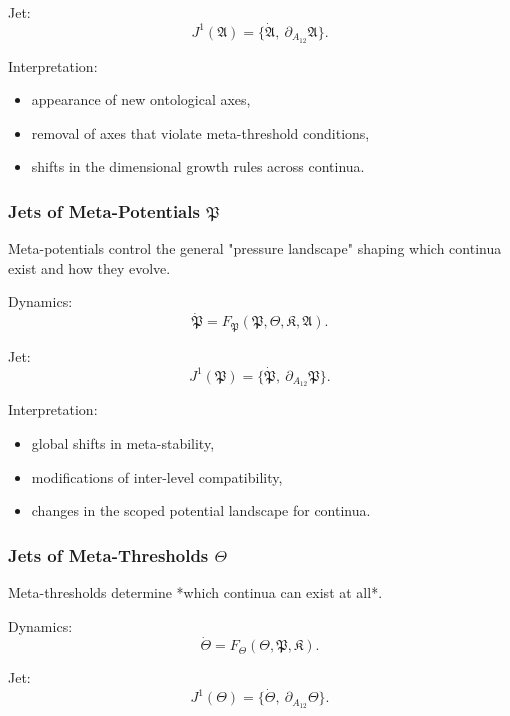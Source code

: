 Jet:
\[
J^1(\mathfrak{A})
= \{\dot{\mathfrak{A}},\ \partial_{A_{12}}\mathfrak{A}\}.
\]

Interpretation:
\begin{itemize}
    \item appearance of new ontological axes,
    \item removal of axes that violate meta-threshold conditions,
    \item shifts in the dimensional growth rules across continua.
\end{itemize}


\subsubsection{Jets of Meta-Potentials $\mathfrak{P}$}

Meta-potentials control the general "pressure landscape" shaping which
continua exist and how they evolve.

Dynamics:
\[
\dot{\mathfrak{P}}
=
F_{\mathfrak{P}}(\mathfrak{P},\mathfrak{\Theta},\mathfrak{K},\mathfrak{A}).
\]

Jet:
\[
J^1(\mathfrak{P})
= \{\dot{\mathfrak{P}},\ \partial_{A_{12}}\mathfrak{P}\}.
\]

Interpretation:
\begin{itemize}
    \item global shifts in meta-stability,
    \item modifications of inter-level compatibility,
    \item changes in the scoped potential landscape for continua.
\end{itemize}


\subsubsection{Jets of Meta-Thresholds $\mathfrak{\Theta}$}

Meta-thresholds determine *which continua can exist at all*.

Dynamics:
\[
\dot{\mathfrak{\Theta}}
=
F_{\mathfrak{\Theta}}(\mathfrak{\Theta},\mathfrak{P},\mathfrak{K}).
\]

Jet:
\[
J^1(\mathfrak{\Theta})
=
\{\dot{\mathfrak{\Theta}},\ \partial_{A_{12}}\mathfrak{\Theta}\}.
\]

